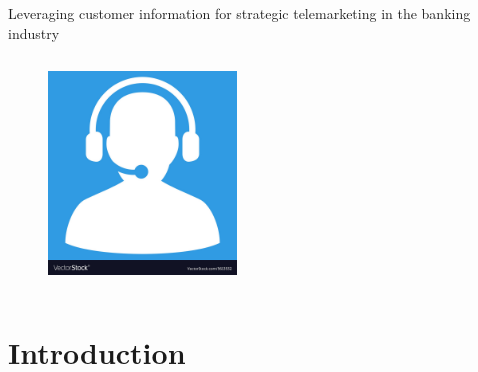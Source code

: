 
\begin{frame}{Leveraging customer information for strategic telemarketing in the banking industry }


\begin{columns}[c]
  \begin{figure}
\includegraphics[width=5cm]{figures/logo_telemarketing.jpg}
 \end{figure}
  \vspace{-.4cm}
    \vspace{-.1cm}
    \center{\today}
\end{columns}


\end{frame}

\section{Introduction} %

